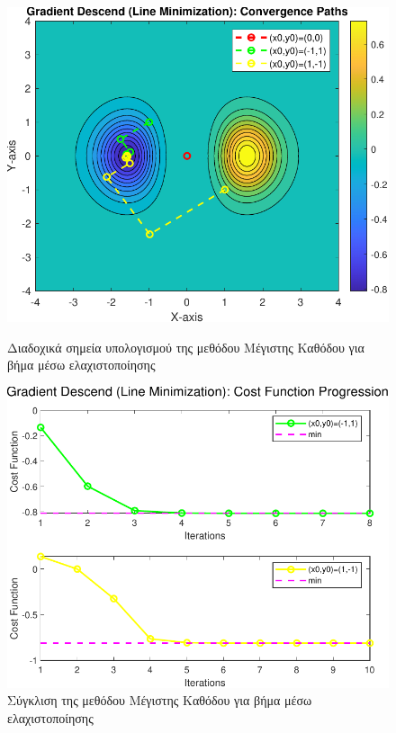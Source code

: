 \documentclass[a4paper,12pt]{article}
\begin{document}
\begin{figure}[h]
    \centering
    \begin{minipage}{0.47\textwidth}
        \centering
        \includegraphics[width=1\linewidth]{plot/gradient_descend_line_minimization_contour.pdf}
        \caption{\small Διαδοχικά σημεία υπολογισμού της μεθόδου Μέγιστης Καθόδου για βήμα μέσω ελαχιστοποίησης}
        \label{fig:gradient_descend_line_minimization_contour}
    \end{minipage} \hfill
    \begin{minipage}{0.47\textwidth}
        \centering
        \includegraphics[width=1\linewidth]{plot/gradient_descend_line_minimization_costs.pdf}
        \caption{\small Σύγκλιση της μεθόδου Μέγιστης Καθόδου για βήμα μέσω ελαχιστοποίησης}
        \label{fig:gradient_descend_line_minimization_costs}
    \end{minipage}
\end{figure}
\end{document}
